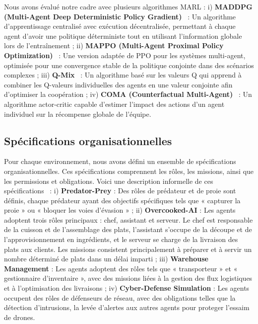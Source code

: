 \documentclass[dissemination]{jfsma}
\begin{document}
Nous avons évalué notre cadre avec plusieurs algorithmes MARL :
i) \textbf{MADDPG (Multi-Agent Deep Deterministic Policy Gradient)}~\cite{lowe2017multi} : Un algorithme d'apprentissage centralisé avec exécution décentralisée, permettant à chaque agent d'avoir une politique déterministe tout en utilisant l'information globale lors de l'entraînement
 ; \quad
ii) \textbf{MAPPO (Multi-Agent Proximal Policy Optimization)}~\cite{yu2021mappo} : Une version adaptée de PPO pour les systèmes multi-agent, optimisée pour une convergence stable de la politique conjointe dans des scénarios complexes
; \quad
iii) \textbf{Q-Mix}~\cite{rashid2018qmix} : Un algorithme basé sur les valeurs Q qui apprend à combiner les Q-valeurs individuelles des agents en une valeur conjointe afin d'optimiser la coopération
; \quad
iv) \textbf{COMA (Counterfactual Multi-Agent)}~\cite{foerster2018counterfactual} : Un algorithme actor-critic capable d'estimer l'impact des actions d'un agent individuel sur la récompense globale de l'équipe.

\subsection{Spécifications organisationnelles}

Pour chaque environnement, nous avons défini un ensemble de spécifications organisationnelles. Ces spécifications comprennent les rôles, les missions, ainsi que les permissions et obligations. Voici une description informelle de ces spécifications~\hyperref[fn:github]{\footnotemark[2]} :
%
i) \textbf{Predator-Prey} : Des rôles de prédateur et de proie sont définis, chaque prédateur ayant des objectifs spécifiques tels que « capturer la proie » ou « bloquer les voies d'évasion »
; \quad
ii) \textbf{Overcooked-AI} : Les agents adoptent trois rôles principaux : chef, assistant et serveur. Le chef est responsable de la cuisson et de l'assemblage des plats, l'assistant s'occupe de la découpe et de l'approvisionnement en ingrédients, et le serveur se charge de la livraison des plats aux clients. Les missions consistent principalement à préparer et à servir un nombre déterminé de plats dans un délai imparti
; \quad
iii) \textbf{Warehouse Management} : Les agents adoptent des rôles tels que « transporteur » et « gestionnaire d'inventaire », avec des missions liées à la gestion des flux logistiques et à l'optimisation des livraisons
; \quad
iv) \textbf{Cyber-Defense Simulation} : Les agents occupent des rôles de défenseurs de réseau, avec des obligations telles que la détection d'intrusions, la levée d'alertes aux autres agents pour proteger l'essaim de drones.
\end{document}
